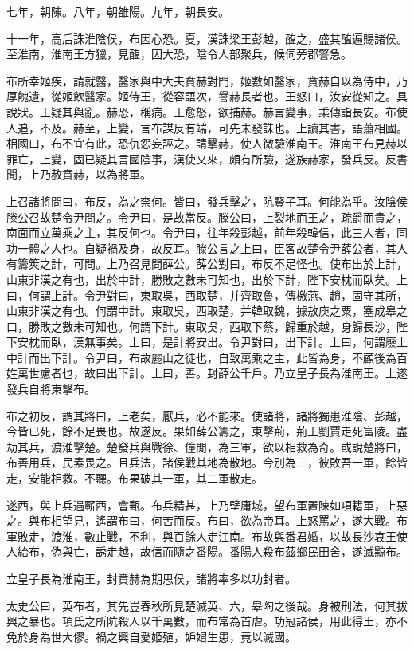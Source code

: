七年，朝陳。八年，朝雒陽。九年，朝長安。

十一年，高后誅淮陰侯，布因心恐。夏，漢誅梁王彭越，醢之，盛其醢遍賜諸侯。至淮南，淮南王方獵，見醢，因大恐，陰令人部聚兵，候伺旁郡警急。

布所幸姬疾，請就醫，醫家與中大夫賁赫對門，姬數如醫家，賁赫自以為侍中，乃厚餽遺，從姬飲醫家。姬侍王，從容語次，譽赫長者也。王怒曰，汝安從知之。具說狀。王疑其與亂。赫恐，稱病。王愈怒，欲捕赫。赫言變事，乘傳詣長安。布使人追，不及。赫至，上變，言布謀反有端，可先未發誅也。上讀其書，語蕭相國。相國曰，布不宜有此，恐仇怨妄誣之。請擊赫，使人微驗淮南王。淮南王布見赫以罪亡，上變，固已疑其言國陰事，漢使又來，頗有所驗，遂族赫家，發兵反。反書聞，上乃赦賁赫，以為將軍。

上召諸將問曰，布反，為之柰何。皆曰，發兵擊之，阬豎子耳。何能為乎。汝陰侯滕公召故楚令尹問之。令尹曰，是故當反。滕公曰，上裂地而王之，疏爵而貴之，南面而立萬乘之主，其反何也。令尹曰，往年殺彭越，前年殺韓信，此三人者，同功一體之人也。自疑禍及身，故反耳。滕公言之上曰，臣客故楚令尹薛公者，其人有籌筴之計，可問。上乃召見問薛公。薛公對曰，布反不足怪也。使布出於上計，山東非漢之有也，出於中計，勝敗之數未可知也，出於下計，陛下安枕而臥矣。上曰，何謂上計。令尹對曰，東取吳，西取楚，并齊取魯，傳檄燕、趙，固守其所，山東非漢之有也。何謂中計。東取吳，西取楚，并韓取魏，據敖庾之粟，塞成皋之口，勝敗之數未可知也。何謂下計。東取吳，西取下蔡，歸重於越，身歸長沙，陛下安枕而臥，漢無事矣。上曰，是計將安出。令尹對曰，出下計。上曰，何謂廢上中計而出下計。令尹曰，布故麗山之徒也，自致萬乘之主，此皆為身，不顧後為百姓萬世慮者也，故曰出下計。上曰，善。封薛公千戶。乃立皇子長為淮南王。上遂發兵自將東擊布。

布之初反，謂其將曰，上老矣，厭兵，必不能來。使諸將，諸將獨患淮陰、彭越，今皆已死，餘不足畏也。故遂反。果如薛公籌之，東擊荊，荊王劉賈走死富陵。盡劫其兵，渡淮擊楚。楚發兵與戰徐、僮閒，為三軍，欲以相救為奇。或說楚將曰，布善用兵，民素畏之。且兵法，諸侯戰其地為散地。今別為三，彼敗吾一軍，餘皆走，安能相救。不聽。布果破其一軍，其二軍散走。

遂西，與上兵遇蘄西，會甀。布兵精甚，上乃壁庸城，望布軍置陳如項籍軍，上惡之。與布相望見，遙謂布曰，何苦而反。布曰，欲為帝耳。上怒罵之，遂大戰。布軍敗走，渡淮，數止戰，不利，與百餘人走江南。布故與番君婚，以故長沙哀王使人紿布，偽與亡，誘走越，故信而隨之番陽。番陽人殺布茲鄉民田舍，遂滅黥布。

立皇子長為淮南王，封賁赫為期思侯，諸將率多以功封者。

太史公曰，英布者，其先豈春秋所見楚滅英、六，皋陶之後哉。身被刑法，何其拔興之暴也。項氏之所阬殺人以千萬數，而布常為首虐。功冠諸侯，用此得王，亦不免於身為世大僇。禍之興自愛姬殖，妒媢生患，竟以滅國。